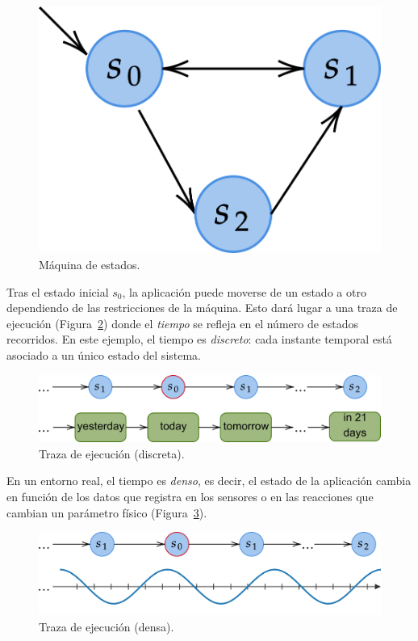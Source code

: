 \begin{figure}
\centering
  \includegraphics{images/state_machine}
\caption{Máquina de estados.}
\label{fig:state_machine}
\end{figure}

Tras el estado inicial $s_0$, la aplicación puede moverse de un estado a otro dependiendo de las restricciones de la máquina. Esto dará lugar a una traza de ejecución (Figura~\ref{fig:trace_discrete}) donde el \textit{tiempo} se refleja en el número de estados recorridos. En este ejemplo, el tiempo es \textit{discreto}: cada instante temporal está asociado a un único estado del sistema.

\begin{figure}
\centering
  \includegraphics{images/trace_discrete}
\caption{Traza de ejecución (discreta).}
\label{fig:trace_discrete}
\end{figure}

En un entorno real, el tiempo es \textit{denso}, es decir, el estado de la aplicación cambia en función de los datos que registra en los sensores o en las reacciones que cambian un parámetro físico (Figura~\ref{fig:trace_dense}).

\begin{figure}
\centering
  \includegraphics{images/trace_dense}
\caption{Traza de ejecución (densa).}
\label{fig:trace_dense}
\end{figure}

